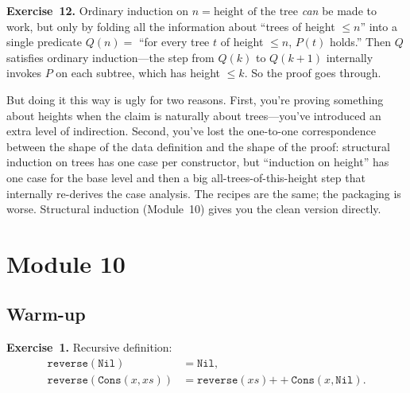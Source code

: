 \documentclass[11pt]{article}
\begin{document}
\medskip
\textbf{Exercise~12.}
Ordinary induction on $n = \text{height of the tree}$ \emph{can} be made to work, but only by folding all the information about ``trees of height $\leq n$'' into a single predicate $Q(n) = $ ``for every tree $t$ of height $\leq n$, $P(t)$ holds.'' Then $Q$ satisfies ordinary induction---the step from $Q(k)$ to $Q(k+1)$ internally invokes $P$ on each subtree, which has height $\leq k$. So the proof goes through.

But doing it this way is ugly for two reasons. First, you're proving something about heights when the claim is naturally about trees---you've introduced an extra level of indirection. Second, you've lost the one-to-one correspondence between the shape of the data definition and the shape of the proof: structural induction on trees has one case per constructor, but ``induction on height'' has one case for the base level and then a big all-trees-of-this-height step that internally re-derives the case analysis. The recipes are the same; the packaging is worse. Structural induction (Module~10) gives you the clean version directly.

\section*{Module 10}

\subsection*{Warm-up}

\textbf{Exercise~1.}
Recursive definition:
\begin{align*}
  \texttt{reverse}(\texttt{Nil}) &= \texttt{Nil}, \\
  \texttt{reverse}(\texttt{Cons}(x, \mathit{xs})) &= \texttt{reverse}(\mathit{xs}) \mathbin{+\!+} \texttt{Cons}(x, \texttt{Nil}).
\end{align*}
\end{document}
